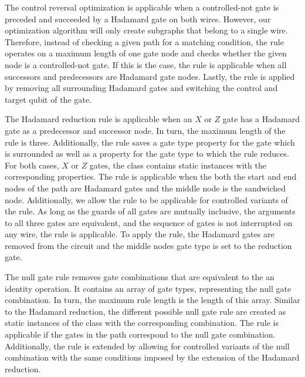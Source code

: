 The control reversal optimization is applicable when a controlled-not gate is preceded and succeeded by a Hadamard gate on both wires. However, our optimization algorithm will only create subgraphs that belong to a single wire. Therefore, instead of checking a given path for a matching condition, the rule operates on a maximum length of one gate node and checks whether the given node is a controlled-not gate. If this is the case, the rule is applicable when all successors and predecessors are Hadamard gate nodes. Lastly, the rule is applied by removing all surrounding Hadamard gates and switching the control and target qubit of the gate.

The Hadamard reduction rule is applicable when an $X$ or $Z$ gate has a Hadamard gate as a predecessor and successor node. In turn, the maximum length of the rule is three. Additionally, the rule saves a gate type property for the gate which is surrounded as well as a property for the gate type to which the rule reduces. For both cases, \ie $X$ or $Z$ gates, the class contains static instances with the corresponding properties. The rule is applicable when the both the start and end nodes of the path are Hadamard gates and the middle node is the sandwiched node. Additionally, we allow the rule to be applicable for controlled variants of the rule. As long as the guards of all gates are mutually inclusive, the arguments to all three gates are equivalent, and the sequence of gates is not interrupted on any wire, the rule is applicable. To apply the rule, the Hadamard gates are removed from the circuit and the middle nodes gate type is set to the reduction gate.

The null gate rule removes gate combinations that are equivalent to the an identity operation. It contains an array of gate types, representing the null gate combination. In turn, the maximum rule length is the length of this array. Similar to the Hadamard reduction, the different possible null gate rule are created as static instances of the class with the corresponding combination. The rule is applicable if the gates in the path correspond to the null gate combination. Additionally, the rule is extended by allowing for controlled variants of the null combination with the same conditions imposed by the extension of the Hadamard reduction.

